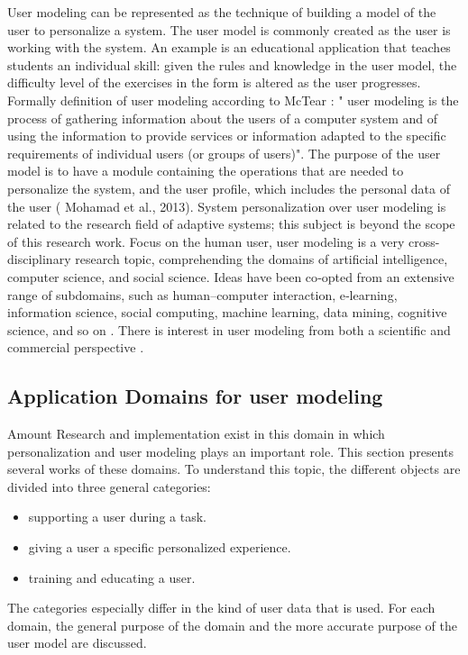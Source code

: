 User modeling can be represented as the technique of building a model of the
user to personalize a system. The user model is commonly created as the user is
working with the system. An example is an educational application that teaches
students an individual skill: given the rules and knowledge in the user model,
the difficulty level of the exercises in the form is altered as the user
progresses.   Formally definition of user modeling according to McTear
\cite{mctear1993user} : " user modeling is the process of gathering information
about the users of a computer system and of using the information to provide
services or information adapted to the specific requirements of individual users
(or groups of users)". The purpose of the user model is to have a module
containing the operations that are needed to personalize the system, and the
user profile, which includes the personal data of the user \cite{}( Mohamad et
al., 2013).    System personalization over user modeling is related to the
research field of adaptive systems; this subject is beyond the scope of this
research work. Focus on the human user, user modeling is a very
cross-disciplinary research topic, comprehending the domains of artificial
intelligence, computer science, and social science. Ideas have been co‐opted
from an extensive range of subdomains, such as human–computer interaction,
e‐learning, information science, social computing, machine learning, data
mining, cognitive science, and so on \cite{kay2012coming}
\cite{kobsa2001generic}. There is interest in user modeling from both a
scientific and commercial perspective \cite{razmerita2009user}.

\subsection{Application Domains for user modeling}

Amount Research and implementation exist in this domain in which personalization
and user modeling plays an important role. This section presents several works
of these domains. To understand this topic, the different objects are divided
into three general categories:
\begin{itemize}
	\item {supporting a user during a task. }
	\item {giving a user a specific personalized experience. }
	\item {training and educating a user.}
\end{itemize}
The categories especially differ in the kind of user data that is used. For each
domain, the general purpose of the domain and the more accurate purpose of the
user model are discussed.

